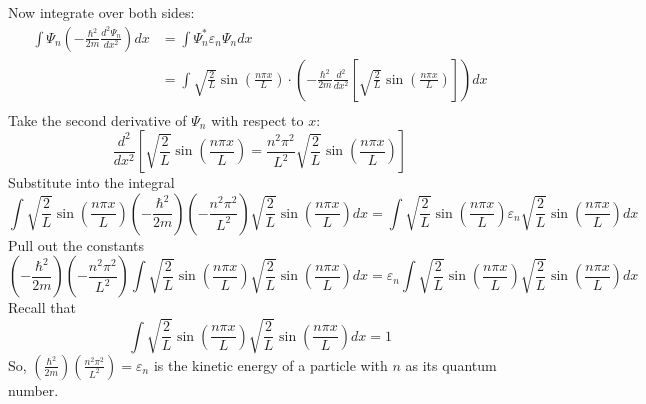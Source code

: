 Now integrate over both sides:
\begin{align*}
	\int \Psi_{n} \left( -\frac{\hbar^{2}}{2m} \frac{d^{2} \Psi_{n}}{dx^{2}} \right) dx 
	&= \int \Psi_{n}^{*} \varepsilon_{n} \Psi_{n} dx \\
	&= \int \sqrt{\frac{2}{L}} \sin \left( \frac{n \pi x}{L} \right) \cdot \left( -\frac{\hbar^{2}}{2m} \frac{d^{2}}{dx^{2}} \left[ \sqrt{\frac{2}{L}} \sin \left( \frac{n \pi x}{L} \right) \right] \right) dx \\
\end{align*}
Take the second derivative of $\Psi_{n}$ with respect to $x$:
\begin{equation*}
	\frac{d^{2}}{dx^{2}} \left[ \sqrt{\frac{2}{L}} \sin \left( \frac{n \pi x}{L} \right) = \frac{n^{2} \pi^{2}}{L^{2}} \sqrt{\frac{2}{L}} \sin \left( \frac{n \pi x}{L} \right) \right]
\end{equation*}
Substitute into the integral
\begin{equation*}
	\int \sqrt{\frac{2}{L}} \sin \left( \frac{n \pi x}{L} \right) \left( -\frac{\hbar^{2}}{2m} \right) \left( -\frac{n^{2} \pi^{2}}{L^{2}} \right) \sqrt{\frac{2}{L}} \sin \left( \frac{n \pi x}{L} \right) dx
	= \int \sqrt{\frac{2}{L}} \sin \left( \frac{n \pi x}{L} \right) \varepsilon_{n} \sqrt{\frac{2}{L}} \sin \left( \frac{n \pi x}{L} \right) dx
\end{equation*}
Pull out the constants
\begin{equation*}
	\left( -\frac{\hbar^{2}}{2m} \right) \left( -\frac{n^{2} \pi^{2}}{L^{2}} \right) \int \sqrt{\frac{2}{L}} \sin \left( \frac{n \pi x}{L} \right) \sqrt{\frac{2}{L}} \sin \left( \frac{n \pi x}{L} \right) dx
	= \varepsilon_{n} \int \sqrt{\frac{2}{L}} \sin \left( \frac{n \pi x}{L} \right) \sqrt{\frac{2}{L}} \sin \left( \frac{n \pi x}{L} \right) dx
\end{equation*}
Recall that 
\begin{equation*}
	\int \sqrt{\frac{2}{L}} \sin \left( \frac{n \pi x}{L} \right) \sqrt{\frac{2}{L}} \sin \left( \frac{n \pi x}{L} \right) dx = 1
\end{equation*}
So, $\left( \frac{\hbar^{2}}{2m} \right) \left( \frac{n^{2} \pi^{2}}{L^{2}} \right) = \varepsilon_{n}$ is the kinetic energy of a particle with $n$ as its quantum number.